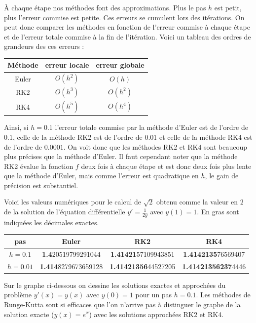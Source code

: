 \documentclass[11pt,class=report,crop=false]{standalone}
\begin{document}
À chaque étape nos méthodes font des approximations. Plus le pas $h$ est petit, plus l'erreur commise est petite.
Ces erreurs se cumulent lors des itérations. On peut donc comparer les méthodes en fonction de l'erreur commise à chaque étape et de l'erreur totale commise à la fin de l'itération.
Voici un tableau des ordres de grandeurs des ces erreurs :

\begin{center}
\begin{tabular}{c|c|c}
Méthode & erreur locale & erreur globale \\
\hline
Euler & $O(h^2)$ & $O(h)$ \\
RK2 & $O(h^3)$ & $O(h^2)$  \\
RK4 & $O(h^5)$ & $O(h^4)$  \\
\end{tabular}
\end{center}

Ainsi, si $h=0.1$ l'erreur totale commise par la méthode d'Euler est de l'ordre de $0.1$, celle de la méthode RK2 est de l'ordre de $0.01$ et celle de la méthode RK4 est de l'ordre de $0.0001$. On voit donc que les méthodes RK2 et RK4 sont beaucoup plus précises que la méthode d'Euler.
Il faut cependant noter que la méthode RK2 évalue la fonction $f$ deux fois à chaque étape et est donc deux fois plus lente que la méthode d'Euler, mais 
comme l'erreur est quadratique en $h$, le gain de précision est substantiel.

Voici les valeurs numériques pour le calcul de $\sqrt{2}$ obtenu comme la valeur en $2$ de la solution de l'équation différentielle $y'=\frac1{2y}$ avec $y(1)=1$. En gras sont indiquées les décimales exactes.

\begin{center}
\begin{tabular}{c|c|c|c}
pas & Euler & RK2 & RK4 \\
\hline
$h=0.1$ 
& \textbf{1.4}20519799291044
& \textbf{1.41421}57109943851
& \textbf{1.4142135}76569407 \\
$h=0.01$
& \textbf{1.414}8279673659128
& \textbf{1.41421356}44527205
& \textbf{1.41421356237}4446 \\
\end{tabular}
\end{center}



Sur le graphe ci-dessous on dessine les solutions exactes et approchées du problème $y'(x)=y(x)$ avec $y(0)=1$ pour un pas $h=0.1$.
Les méthodes de Runge-Kutta sont si efficaces que l'on n'arrive pas à distinguer le graphe de la solution exacte ($y(x) = e^x$) avec les solutions approchées RK2 et RK4.
\end{document}
